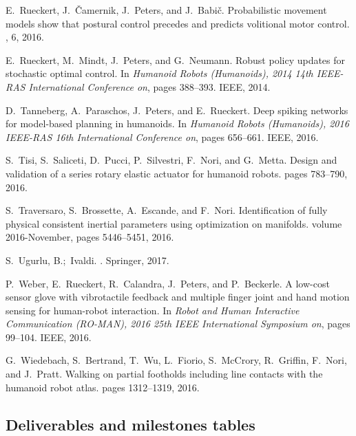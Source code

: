 \documentclass[12pt,a4paper,twoside]{article}
\begin{document}
\begin{thebibliography}{}
E.~Rueckert, J.~{\v{C}}amernik, J.~Peters, and J.~Babi{\v{c}}.
\newblock Probabilistic movement models show that postural control precedes and
  predicts volitional motor control.
, 6, 2016.

E.~Rueckert, M.~Mindt, J.~Peters, and G.~Neumann.
\newblock Robust policy updates for stochastic optimal control.
\newblock In {\em Humanoid Robots (Humanoids), 2014 14th IEEE-RAS International
  Conference on}, pages 388--393. IEEE, 2014.

D.~Tanneberg, A.~Paraschos, J.~Peters, and E.~Rueckert.
\newblock Deep spiking networks for model-based planning in humanoids.
\newblock In {\em Humanoid Robots (Humanoids), 2016 IEEE-RAS 16th International
  Conference on}, pages 656--661. IEEE, 2016.

S.~Tisi, S.~Saliceti, D.~Pucci, P.~Silvestri, F.~Nori, and G.~Metta.
\newblock Design and validation of a series rotary elastic actuator for
  humanoid robots.
\newblock pages 783--790, 2016.

S.~Traversaro, S.~Brossette, A.~Escande, and F.~Nori.
\newblock Identification of fully physical consistent inertial parameters using
  optimization on manifolds.
\newblock volume 2016-November, pages 5446--5451, 2016.

S.~Ugurlu, B.;~Ivaldi.
.
\newblock Springer, 2017.

P.~Weber, E.~Rueckert, R.~Calandra, J.~Peters, and P.~Beckerle.
\newblock A low-cost sensor glove with vibrotactile feedback and multiple
  finger joint and hand motion sensing for human-robot interaction.
\newblock In {\em Robot and Human Interactive Communication (RO-MAN), 2016 25th
  IEEE International Symposium on}, pages 99--104. IEEE, 2016.

G.~Wiedebach, S.~Bertrand, T.~Wu, L.~Fiorio, S.~McCrory, R.~Griffin, F.~Nori,
  and J.~Pratt.
\newblock Walking on partial footholds including line contacts with the
  humanoid robot atlas.
\newblock pages 1312--1319, 2016.
\end{thebibliography}

\subsection{Deliverables and milestones tables}
\end{document}
